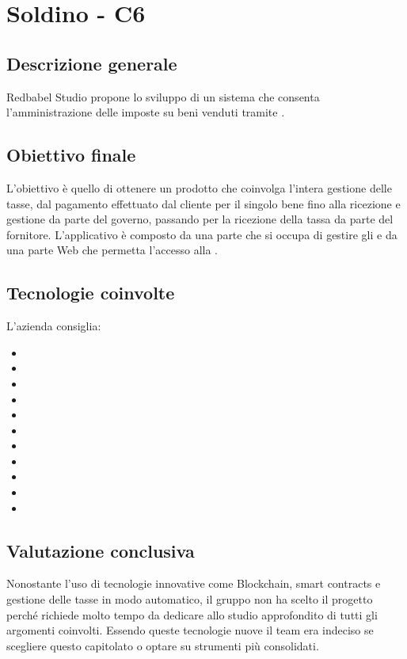 \section{Soldino - C6} \label{c6}
    \subsection{Descrizione generale}
    Redbabel Studio propone lo sviluppo di un sistema che consenta l'amministrazione delle  imposte su beni venduti tramite .
    \subsection{Obiettivo finale}

    L'obiettivo è quello di ottenere un prodotto che coinvolga l'intera gestione delle tasse, dal pagamento effettuato dal cliente per il singolo bene
    fino alla ricezione e gestione da parte del governo, passando per la ricezione della tassa da parte del fornitore.
    L'applicativo è composto da una parte che si occupa di gestire gli  e da una parte Web che permetta l'accesso alla .

    \subsection{Tecnologie coinvolte}
	L'azienda consiglia:
    	\begin{itemize}
        \item {}
		\item {}
        \item {}
		\item {}
		\item {}
		\item {}
		\item {}
        \item {}
        \item {}
        \item {}
        \item {}
	\end{itemize}

    \subsection{Valutazione conclusiva}
    Nonostante l'uso di tecnologie innovative come Blockchain, smart contracts e gestione delle tasse in modo automatico, il gruppo non ha scelto
    il progetto perché richiede molto tempo da dedicare allo studio approfondito di tutti gli argomenti coinvolti.
    Essendo queste tecnologie nuove il team era indeciso se scegliere questo capitolato o optare su strumenti più consolidati.